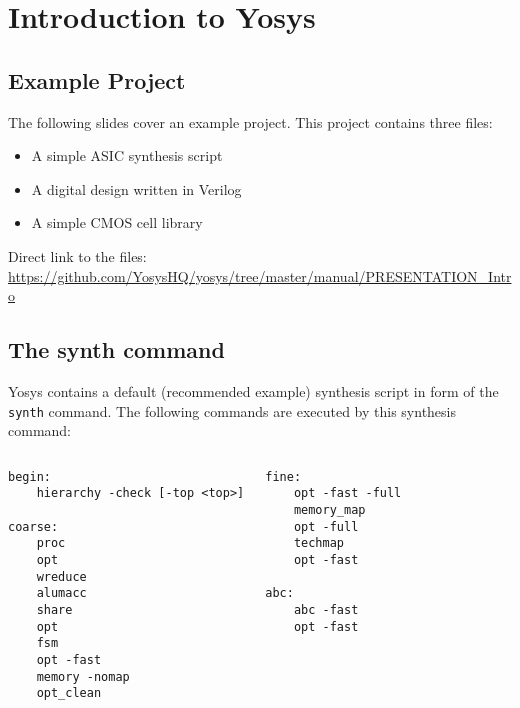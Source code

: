 
\section{Introduction to Yosys}

\begin{frame}
\sectionpage
\end{frame}

\iffalse

\subsection{Example Project}

\begin{frame}[t]{\subsecname}
The following slides cover an example project. This project contains three files:
\begin{itemize}
\item A simple ASIC synthesis script
\item A digital design written in Verilog
\item A simple CMOS cell library
\end{itemize}
\vfill
Direct link to the files: \\ \footnotesize
\url{https://github.com/YosysHQ/yosys/tree/master/manual/PRESENTATION_Intro}
\end{frame}


\subsection{The synth command}

\begin{frame}[fragile]{\subsecname{}}
Yosys contains a default (recommended example) synthesis script in form of the
{\tt synth} command. The following commands are executed by this synthesis command:

\begin{columns}
\column[t]{5cm}
\begin{lstlisting}[xleftmargin=1cm, basicstyle=\ttfamily\fontsize{8pt}{10pt}\selectfont, language=ys]
begin:
    hierarchy -check [-top <top>]

coarse:
    proc
    opt
    wreduce
    alumacc
    share
    opt
    fsm
    opt -fast
    memory -nomap
    opt_clean
\end{lstlisting}
\column[t]{5cm}
\begin{lstlisting}[xleftmargin=1cm, basicstyle=\ttfamily\fontsize{8pt}{10pt}\selectfont, language=ys]
fine:
    opt -fast -full
    memory_map
    opt -full
    techmap
    opt -fast

abc:
    abc -fast
    opt -fast
\end{lstlisting}
\end{columns}
\end{frame}

